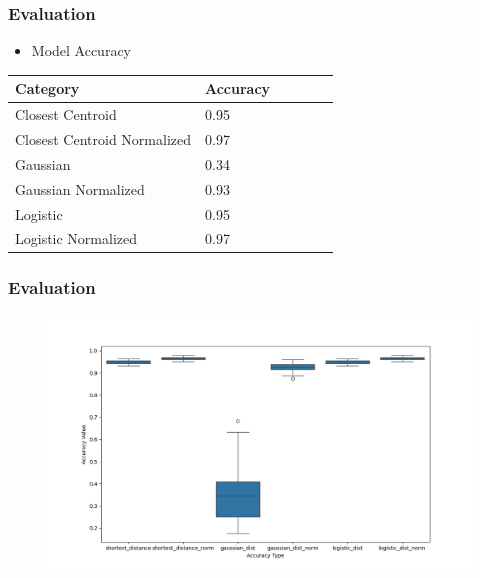 \documentclass[
    10pt %
    16:9, %
]{beamer}
\begin{document}
\begin{frame}
  \frametitle{Evaluation}
  \begin{itemize}
    \item Model Accuracy
  \end{itemize}
  \begin{table}
    \centering
    \begin{tabular}{@{}llllll@{}}
        \toprule
        Category       & Accuracy\\ \midrule
        Closest Centroid       & 0.95\\
        Closest Centroid Normalized  & 0.97\\
        Gaussian       &0.34 \\
        Gaussian Normalized          &0.93 \\
        Logistic           &0.95 \\
        Logistic Normalized           &0.97 \\
        \bottomrule
    \end{tabular}
  \end{table}
\end{frame}

\begin{frame}
  \frametitle{Evaluation}
  \begin{figure}
    \centering
    \includegraphics[width=1\textwidth]{error_map.png}
  \end{figure}
\end{frame}
\end{document}
